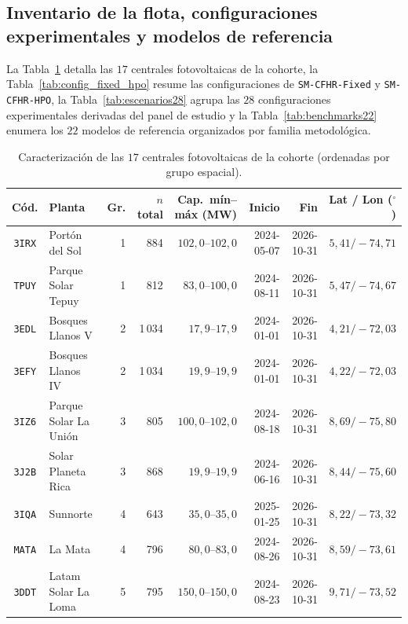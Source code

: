 \subsection{Inventario de la flota, configuraciones experimentales y modelos de referencia}\label{ap:escenarios}

La Tabla~\ref{tab:flota17} detalla las $17$ centrales fotovoltaicas de la cohorte, la Tabla~\ref{tab:config_fixed_hpo} resume las configuraciones de \texttt{SM-CFHR-Fixed} y \texttt{SM-CFHR-HPO}, la Tabla~\ref{tab:escenarios28} agrupa las $28$ configuraciones experimentales derivadas del panel de estudio y la Tabla~\ref{tab:benchmarks22} enumera los $22$ modelos de referencia organizados por familia metodológica.

\begin{table}[!htbp]
\caption{Caracterización de las $17$ centrales fotovoltaicas de la cohorte (ordenadas por grupo espacial).}\label{tab:flota17}
\scriptsize
\setlength{\tabcolsep}{3.5pt}
\begin{tabular}{@{}clrrrrrr@{}}
\toprule
Cód. & Planta & Gr. & $n$ total & Cap.\ mín--máx (MW) & Inicio & Fin & Lat / Lon ($^\circ$) \\
\midrule
\texttt{3IRX} & Portón del Sol & 1 & 884 & $102{,}0$--$102{,}0$ & 2024-05-07 & 2026-10-31 & $5{,}41 / -74{,}71$ \\
\texttt{TPUY} & Parque Solar Tepuy & 1 & 812 & $83{,}0$--$100{,}0$ & 2024-08-11 & 2026-10-31 & $5{,}47 / -74{,}67$ \\
\texttt{3EDL} & Bosques Llanos V & 2 & 1\,034 & $17{,}9$--$17{,}9$ & 2024-01-01 & 2026-10-31 & $4{,}21 / -72{,}03$ \\
\texttt{3EFY} & Bosques Llanos IV & 2 & 1\,034 & $19{,}9$--$19{,}9$ & 2024-01-01 & 2026-10-31 & $4{,}22 / -72{,}03$ \\
\texttt{3IZ6} & Parque Solar La Unión & 3 & 805 & $100{,}0$--$102{,}0$ & 2024-08-18 & 2026-10-31 & $8{,}69 / -75{,}80$ \\
\texttt{3J2B} & Solar Planeta Rica & 3 & 868 & $19{,}9$--$19{,}9$ & 2024-06-16 & 2026-10-31 & $8{,}44 / -75{,}60$ \\
\texttt{3IQA} & Sunnorte & 4 & 643 & $35{,}0$--$35{,}0$ & 2025-01-25 & 2026-10-31 & $8{,}22 / -73{,}32$ \\
\texttt{MATA} & La Mata & 4 & 796 & $80{,}0$--$83{,}0$ & 2024-08-26 & 2026-10-31 & $8{,}59 / -73{,}61$ \\
\texttt{3DDT} & Latam Solar La Loma & 5 & 795 & $150{,}0$--$150{,}0$ & 2024-08-23 & 2026-10-31 & $9{,}71 / -73{,}52$ \\

\end{tabular}
\end{table}
